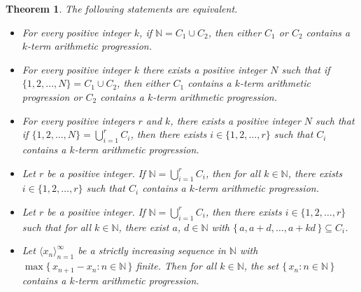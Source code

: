 \documentclass[12pt,showtrims]{memoir}
\theoremstyle{plain}
\newtheorem{thm}{Theorem}[section]
\theoremstyle{definition}
\newcommand{\la}{\langle}
\newcommand{\ra}{\rangle}
\newcommand{\bbN}{\mathbb{N}}
\begin{document}
\begin{thm}
  \label{thm:vdwEqSyn}
  The following statements are equivalent.
  \begin{itemize}
    \item[(a)]
      For every positive integer $k$, if $\bbN = C_1 \cup C_2$, then either $C_1$ or $C_2$ contains a $k$-term arithmetic progression. 

    \item[(b)]
      For every positive integer $k$ there exists a positive integer $N$ such that if $\{1, 2, \ldots, N\} = C_1 \cup C_2$, then either $C_1$ contains a $k$-term arithmetic progression or $C_2$ contains a $k$-term arithmetic progression.

    \item[(c)]
      For every positive integers $r$ and $k$, there exists a positive integer $N$ such that if $\{1, 2, \ldots, N\} = \bigcup_{i=1}^r C_i$, then there exists $i \in \{1, 2, \ldots, r\}$ such that $C_i$ contains a $k$-term arithmetic progression.

    \item[(d)]
      Let $r$ be a positive integer.
      If $\bbN = \bigcup_{i=1}^r C_i$, then for all $k \in \bbN$, there exists $i \in \{1, 2, \ldots, r\}$ such that $C_i$ contains a $k$-term arithmetic progression.

    \item[(e)]
      Let $r$ be a positive integer.
      If $\bbN = \bigcup_{i=1}^r C_i$, then there exists $i \in \{1, 2, \ldots, r\}$ such that for all $k \in \bbN$, there exist $a$, $d \in \bbN$ with $\{\, a, a+d, \ldots, a+k d \,\} \subseteq C_i$. 
      
    \item[(f)] 
      Let $\la x_n \ra_{n=1}^\infty$ be a strictly increasing sequence in $\bbN$ with $\max\{\, x_{n+1} - x_n : n \in \bbN \,\}$ finite.
      Then for all $k \in \bbN$, the set $\{\, x_n : n \in \bbN \,\}$ contains a $k$-term arithmetic progression.
  \end{itemize}
\end{thm}
\end{document}
